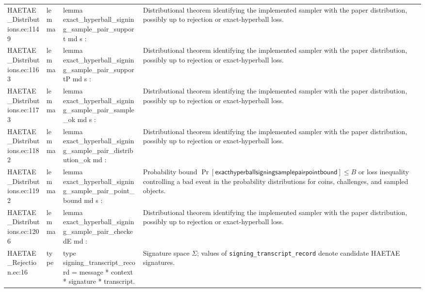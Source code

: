 \documentclass[10pt]{article}
\newcommand{\EC}[1]{\texttt{#1}}
\begin{document}
\begin{longtable}{L{0.11\textwidth}L{0.055\textwidth}L{0.385\textwidth}L{0.41\textwidth}}
HAETAE\_\allowbreak{}Distributions.\allowbreak{}ec:\allowbreak{}1149 & lemma & {\ttfamily\scriptsize lemma exact\_\allowbreak{}hyperball\_\allowbreak{}signing\_\allowbreak{}sample\_\allowbreak{}pair\_\allowbreak{}support md s :} & Distributional theorem identifying the implemented sampler with the paper distribution, possibly up to rejection or exact-hyperball loss. \\
HAETAE\_\allowbreak{}Distributions.\allowbreak{}ec:\allowbreak{}1163 & lemma & {\ttfamily\scriptsize lemma exact\_\allowbreak{}hyperball\_\allowbreak{}signing\_\allowbreak{}sample\_\allowbreak{}pair\_\allowbreak{}supportP md s :} & Distributional theorem identifying the implemented sampler with the paper distribution, possibly up to rejection or exact-hyperball loss. \\
HAETAE\_\allowbreak{}Distributions.\allowbreak{}ec:\allowbreak{}1173 & lemma & {\ttfamily\scriptsize lemma exact\_\allowbreak{}hyperball\_\allowbreak{}signing\_\allowbreak{}sample\_\allowbreak{}pair\_\allowbreak{}sample\_\allowbreak{}ok md s :} & Distributional theorem identifying the implemented sampler with the paper distribution, possibly up to rejection or exact-hyperball loss. \\
HAETAE\_\allowbreak{}Distributions.\allowbreak{}ec:\allowbreak{}1182 & lemma & {\ttfamily\scriptsize lemma exact\_\allowbreak{}hyperball\_\allowbreak{}signing\_\allowbreak{}sample\_\allowbreak{}pair\_\allowbreak{}distribution\_\allowbreak{}ok md :} & Distributional theorem identifying the implemented sampler with the paper distribution, possibly up to rejection or exact-hyperball loss. \\
HAETAE\_\allowbreak{}Distributions.\allowbreak{}ec:\allowbreak{}1192 & lemma & {\ttfamily\scriptsize lemma exact\_\allowbreak{}hyperball\_\allowbreak{}signing\_\allowbreak{}sample\_\allowbreak{}pair\_\allowbreak{}point\_\allowbreak{}bound md s :} & Probability bound $\Pr[\mathsf{exacthyperballsigningsamplepairpointbound}]\le B$ or loss inequality controlling a bad event in the probability distributions for coins, challenges, and sampled objects. \\
HAETAE\_\allowbreak{}Distributions.\allowbreak{}ec:\allowbreak{}1206 & lemma & {\ttfamily\scriptsize lemma exact\_\allowbreak{}hyperball\_\allowbreak{}signing\_\allowbreak{}sample\_\allowbreak{}pair\_\allowbreak{}checkedE md :} & Distributional theorem identifying the implemented sampler with the paper distribution, possibly up to rejection or exact-hyperball loss. \\
HAETAE\_\allowbreak{}Rejection.\allowbreak{}ec:\allowbreak{}16 & type & {\ttfamily\scriptsize type signing\_\allowbreak{}transcript\_\allowbreak{}record = message * context * signature * transcript.} & Signature space $\Sigma$; values of \EC{signing\_transcript\_record} denote candidate HAETAE signatures. \\

\end{longtable}
\end{document}
